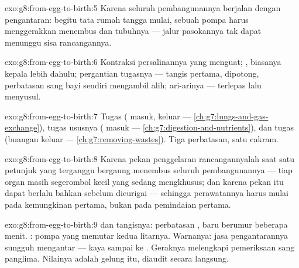 \begin{solution}{exo:g8:from-egg-to-birth:5}
Karena seluruh pembangunannya berjalan dengan pengantaran:
begitu tata rumah tangga  mulai, sebuah pompa
harus menggerakkan   menembus  dan
tubuhnya --- jalur pasokannya tak dapat menunggu sisa
rancangannya.
\end{solution}

\begin{solution}{exo:g8:from-egg-to-birth:6}
Kontraksi persalinannya yang menguat; , biasanya
kepala lebih dahulu; pergantian tugasnya --- tangis pertama,
 dipotong, perbatasan sang bayi sendiri mengambil
alih; ari-arinya ---  terlepas lalu menyusul.
\end{solution}

\begin{solution}{exo:g8:from-egg-to-birth:7}
Tugas  ( masuk,  keluar
--- \cref{ch:g7:lungs-and-gas-exchange}), tugas ususnya ( masuk --- \cref{ch:g7:digestion-and-nutrients}), dan
tugas  (buangan keluar ---
\cref{ch:g7:removing-wastes}). Tiga perbatasan, satu cakram.
\end{solution}

\begin{solution}{exo:g8:from-egg-to-birth:8}
Karena pekan penggelaran rancangannyalah saat satu petunjuk
yang terganggu bergaung menembus seluruh pembangunannya ---
tiap organ masih segerombol kecil  yang sedang mengkhusus;
dan karena pekan itu dapat berlalu bahkan sebelum
 dicurigai --- sehingga perawatannya harus mulai
pada kemungkinan pertama, bukan pada pemindaian pertama.
\end{solution}

\begin{solution}{exo:g8:from-egg-to-birth:9}
 dan tangisnya: perbatasan , baru
berumur beberapa menit. : pompa yang
memutar kedua litarnya. Warnanya: jasa pengantarannya
sungguh mengantar ---  kaya  sampai ke 
. Geraknya melengkapi pemeriksaan sang panglima.
Nilainya adalah gelung itu, diaudit secara langsung.
\end{solution}

